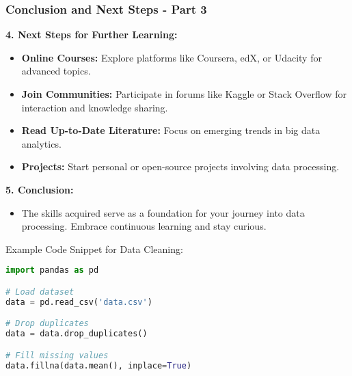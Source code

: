 \documentclass[aspectratio=169]{beamer}
\begin{document}
\begin{frame}[fragile]
    \frametitle{Conclusion and Next Steps - Part 3}
    
    \textbf{4. Next Steps for Further Learning:}
    \begin{itemize}
        \item \textbf{Online Courses:} Explore platforms like Coursera, edX, or Udacity for advanced topics.
        \item \textbf{Join Communities:} Participate in forums like Kaggle or Stack Overflow for interaction and knowledge sharing.
        \item \textbf{Read Up-to-Date Literature:} Focus on emerging trends in big data analytics.
        \item \textbf{Projects:} Start personal or open-source projects involving data processing.
    \end{itemize}

    \textbf{5. Conclusion:}
    \begin{itemize}
        \item The skills acquired serve as a foundation for your journey into data processing. Embrace continuous learning and stay curious.
    \end{itemize}

    \begin{block}{Example Code Snippet for Data Cleaning:}
    \begin{lstlisting}[language=Python]
import pandas as pd

# Load dataset
data = pd.read_csv('data.csv')

# Drop duplicates
data = data.drop_duplicates()

# Fill missing values
data.fillna(data.mean(), inplace=True)
    \end{lstlisting}
    \end{block}
\end{frame}
\end{document}
